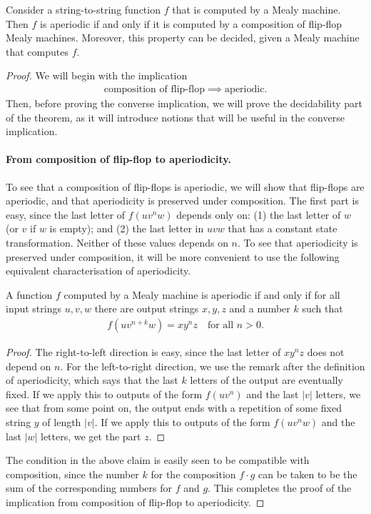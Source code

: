\begin{theorem}\label{thm:aperiodic-mealy}
    Consider a string-to-string function $f$ that is computed by a Mealy machine. Then $f$ is aperiodic if and only if it is computed by a  composition of flip-flop Mealy machines. Moreover, this property can be decided, given a Mealy machine that computes $f$.
\end{theorem}



\begin{proof}
We will begin with the implication 
\begin{align*}
\text{composition of flip-flop} \implies \text{aperiodic}.
\end{align*}
Then, before proving the converse implication, we will prove the decidability part of the theorem, as it will introduce notions  that will be useful in the converse implication.

\paragraph*{From composition of flip-flop to aperiodicity.} To see that a composition of flip-flops is aperiodic, we will show that flip-flops are aperiodic, and that aperiodicity is preserved under composition.  The first part is easy, since the last letter of $f(uv^nw)$ depends only on: (1) the last letter of $w$ (or $v$ if $w$ is empty); and (2) the last letter in $uvw$ that has a constant state transformation. Neither of these values depends on $n$. To see that aperiodicity is preserved under composition, it will be more convenient to use the following equivalent characterisation of aperiodicity.
\begin{claim}\label{claim:aperiodic-pumping}
    A function  $f$ computed by a Mealy machine is aperiodic if and only if for all input strings $u,v,w$ there are output strings $x,y,z$ and a number $k$ such that
    \begin{align*}
    f(uv^{n+k}w) =  xy^n z \quad \text{for all $n > 0$}.
    \end{align*}
\end{claim}
\begin{proof}
    The right-to-left direction is easy, since the last letter of $xy^nz$ does not depend on $n$. For the left-to-right direction, we use the remark after the definition of aperiodicity, which says that the last $k$ letters of the output  are eventually fixed. If we apply this to outputs of the form $f(uv^n)$ and the last $|v|$ letters,  we see that  from some point on, the output ends with a repetition of some fixed string $y$ of length $|v|$. If we apply this to outputs of the form $f(uv^nw)$ and the last $|w|$ letters, we get the part $z$.
\end{proof}
The condition in the above claim is easily seen to be compatible with composition, since the number $k$ for the composition $f \cdot g$ can be taken to be the sum of the corresponding numbers for $f$ and $g$. This completes the proof of the implication from composition of flip-flop to aperiodicity.




\end{proof}
